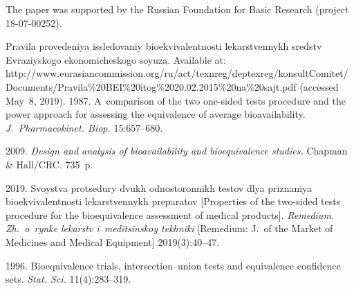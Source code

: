 \Ack
   \noindent
   The paper was supported by the Russian Foundation for Basic Research (project  
18-07-00252).



  \begin{multicols}{2}

\renewcommand{\bibname}{\protect\rmfamily References}

{\small\frenchspacing
 {%
 \begin{thebibliography}{9}

Pravila provedeniya issledovaniy bioekvivalentnosti 
lekarstvennykh sredstv Evraziyskogo ekonomicheskogo soyuza. Available at:
{\sf http://www.eurasiancommission.\linebreak org/ru/act/texnreg/deptexreg/konsultComitet/\linebreak Documents/Pravila\%20BEI\%20itog\%2020.02.2015\%20\linebreak na\%20sajt.pdf}
  (accessed May~8, 2019).
 1987. 
A~comparison of the two one-sided tests procedure and the power approach for 
assessing the equivalence of average bioavailability.
\textit{J.~Pharmacokinet. Biop.} 15:657--680.

\columnbreak 

 2009. \textit{Design 
and analysis of bioavailability and bioequivalence studies.} 
Chapman \& Hall/CRC. 735~p.

\vspace*{-2pt}

 2019. Svoystva protsedury dvukh odnostoronnikh testov dlya priznaniya
  bioekvivalentnosti lekarstvennykh preparatov [Properties of the 
   two-sided tests procedure for the  bioequivalence assessment of medical products]. 
  \textit{Remedium. Zh.~o~rynke lekarstv i~meditsinskoy tekhniki}
   [Remedium: J.~of the Market of Medicines and Medical Equipment] 2019(3):40--47.
   
   \vspace*{-2pt}
   
 1996. 
Bioequivalence trials, intersection--union tests and equivalence confidence sets. 
\textit{Stat. Sci.} 11(4):283--319.
\end{thebibliography}

 }
 }

\end{multicols}

